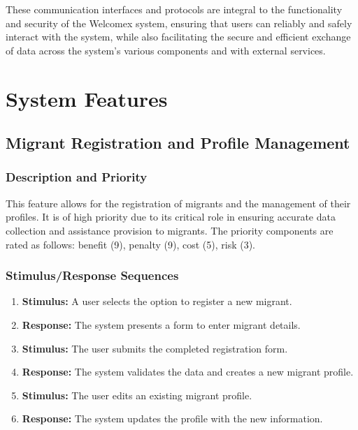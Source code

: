 \documentclass{scrreprt}
\begin{document}
These communication interfaces and protocols are integral to the functionality and security of the Welcomex system, ensuring that users can reliably and safely interact with the system, while also facilitating the secure and efficient exchange of data across the system's various components and with external services.

\chapter{System Features}
\section{Migrant Registration and Profile Management}
\subsection{Description and Priority}
This feature allows for the registration of migrants and the management of their profiles. It is of high priority due to its critical role in ensuring accurate data collection and assistance provision to migrants. The priority components are rated as follows: benefit (9), penalty (9), cost (5), risk (3).
\subsection{Stimulus/Response Sequences}
\begin{enumerate}
    \item \textbf{Stimulus:} A user selects the option to register a new migrant.
    \item \textbf{Response:} The system presents a form to enter migrant details.
    \item \textbf{Stimulus:} The user submits the completed registration form.
    \item \textbf{Response:} The system validates the data and creates a new migrant profile.
    \item \textbf{Stimulus:} The user edits an existing migrant profile.
    \item \textbf{Response:} The system updates the profile with the new information.
\end{enumerate}
\end{document}
